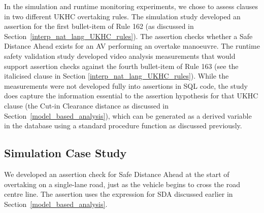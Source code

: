 

In the simulation and runtime monitoring experiments, we chose to assess clauses in two different UKHC overtaking rules. The simulation study developed an assertion for the first bullet-item of Rule 162 (as discussed in Section~\ref{interp_nat_lang_UKHC_rules}). 
The assertion checks whether a Safe Distance Ahead exists for an AV performing an overtake manoeuvre.
%
The runtime safety validation study developed video analysis measurements that would support assertion checks against the fourth bullet-item of Rule 163 
(see the italicised clause in Section \ref{interp_nat_lang_UKHC_rules}).
While the measurements were not developed fully into assertions in SQL code, the study does capture the information essential to the assertion hypothesis for that UKHC clause (the Cut-in Clearance distance as discussed in Section~\ref{model_based_analysis}), which can be generated as a derived variable in the database using a standard procedure function as discussed previously.

\subsection{Simulation Case Study}  \label{sim_case_study}
We developed an assertion check for Safe Distance Ahead at the start of overtaking on a single-lane road, just as the vehicle begins to cross the road centre line. The assertion uses the expression for SDA discussed earlier in Section~\ref{model_based_analysis}. 


